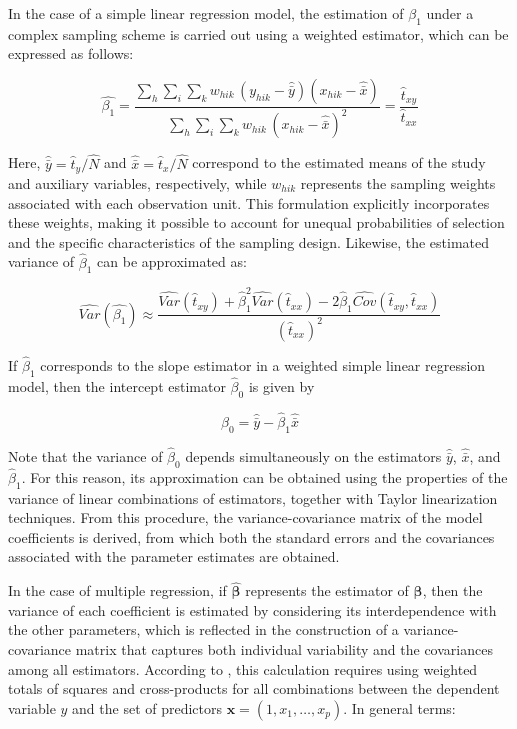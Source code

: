 \documentclass[
  english,
  12pt,
]{book}
\begin{document}
In the case of a simple linear regression model, the estimation of \(\beta_1\) under a complex sampling scheme is carried out using a weighted estimator, which can be expressed as follows:

\[
\hat{\beta_{1}}  =
\frac{\sum_{h} \sum_{i} \sum_{k} w_{hik}\,(y_{hik}-\hat{\bar{y}})(x_{hik}-\hat{\bar{x}})}
{\sum_{h} \sum_{i} \sum_{k} w_{hik}\,(x_{hik}-\hat{\bar{x}})^{2}}
=
\frac{\hat{t}_{xy}}{\hat{t}_{xx}}
\]

Here, \(\hat{\bar{y}}=\hat{t}_y/\hat{N}\) and \(\hat{\bar{x}}=\hat{t}_x/\hat{N}\) correspond to the estimated means of the study and auxiliary variables, respectively, while \(w_{hik}\) represents the sampling weights associated with each observation unit. This formulation explicitly incorporates these weights, making it possible to account for unequal probabilities of selection and the specific characteristics of the sampling design. Likewise, the estimated variance of \(\hat{\beta}_1\) can be approximated as:

\[
\widehat{Var}\left(\hat{\beta_{1}}\right)
\approx  \frac{\widehat{Var}(\hat{t}_{xy})+\hat{\beta}_{1}^{2}\widehat{Var}(\hat{t}_{xx})-2\hat{\beta}_{1}\widehat{Cov}(\hat{t}_{xy},\hat{t}_{xx})}{(\hat{t}_{xx})^{2}}
\]

If \(\hat{\beta}_{1}\) corresponds to the slope estimator in a weighted simple linear regression model, then the intercept estimator \(\hat{\beta}_{0}\) is given by

\[
\hat{\beta}_{0} = \hat{\bar{y}} - \hat{\beta}_{1}\hat{\bar{x}}
\]

Note that the variance of \(\hat{\beta}_{0}\) depends simultaneously on the estimators \(\hat{\bar{y}}\), \(\hat{\bar{x}}\), and \(\hat{\beta}_{1}\). For this reason, its approximation can be obtained using the properties of the variance of linear combinations of estimators, together with Taylor linearization techniques. From this procedure, the variance-covariance matrix of the model coefficients is derived, from which both the standard errors and the covariances associated with the parameter estimates are obtained.

In the case of multiple regression, if \(\hat{\boldsymbol{\beta}}\) represents the estimator of \(\boldsymbol{\beta}\), then the variance of each coefficient is estimated by considering its interdependence with the other parameters, which is reflected in the construction of a variance-covariance matrix that captures both individual variability and the covariances among all estimators. According to \citet{kish1974inference}, this calculation requires using weighted totals of squares and cross-products for all combinations between the dependent variable \(y\) and the set of predictors \(\mathbf{x} = (1, x_1, \ldots, x_p)\). In general terms:
\end{document}
